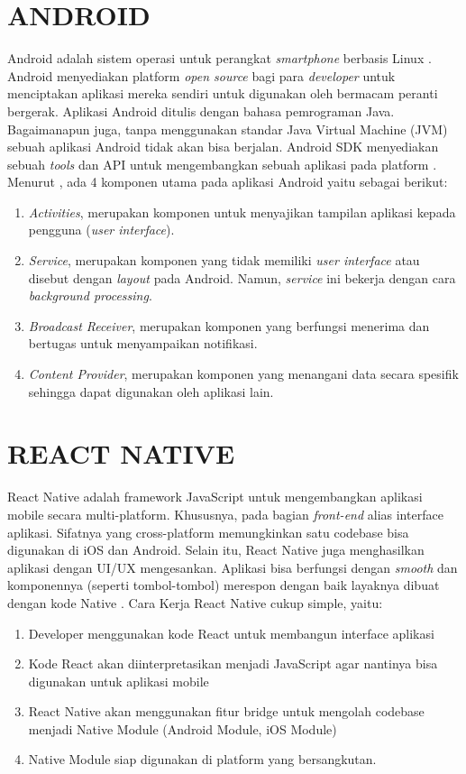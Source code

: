 \section{\uppercase{ANDROID}}
Android adalah sistem operasi untuk perangkat \textit{smartphone} berbasis Linux \citep{Safaat2011}. Android menyediakan platform \textit{open source} bagi para \textit{developer} untuk menciptakan aplikasi mereka sendiri untuk digunakan oleh bermacam peranti bergerak. Aplikasi Android ditulis dengan bahasa pemrograman Java. Bagaimanapun juga, tanpa menggunakan standar Java Virtual Machine (JVM) sebuah aplikasi Android tidak akan bisa berjalan. Android SDK menyediakan sebuah \textit{tools} dan API untuk mengembangkan sebuah aplikasi pada platform \citep{Sarkar2019}. Menurut \cite{Supardi2011}, ada 4 komponen utama pada aplikasi Android yaitu sebagai berikut:
\begin{enumerate}[1.]
	\itemsep0em
	\item \emph{Activities}, merupakan komponen untuk menyajikan tampilan aplikasi kepada pengguna (\textit{user interface}).
	\item \emph{Service}, merupakan komponen yang tidak memiliki \textit{user interface} atau disebut dengan \textit{layout} pada Android. Namun, \textit{service} ini bekerja dengan cara \textit{background processing}.
	\item \emph{Broadcast Receiver}, merupakan komponen yang berfungsi menerima dan bertugas untuk menyampaikan notifikasi.
	\item \emph{Content Provider}, merupakan komponen yang menangani data secara spesifik sehingga dapat digunakan oleh aplikasi lain.
\end{enumerate}

\section{\uppercase{REACT NATIVE}}
React Native adalah framework JavaScript untuk mengembangkan aplikasi mobile secara multi-platform. Khususnya, pada bagian \textit{front-end} alias interface aplikasi. Sifatnya yang cross-platform memungkinkan satu codebase bisa digunakan di iOS dan Android. Selain itu, React Native juga menghasilkan aplikasi dengan UI/UX mengesankan. Aplikasi bisa berfungsi dengan \textit{smooth} dan komponennya (seperti tombol-tombol) merespon dengan baik layaknya dibuat dengan kode Native \citep{Brito2018}. Cara Kerja React Native cukup simple, yaitu:
\begin{enumerate}[1.]
	\itemsep0em
	\item Developer menggunakan kode React untuk membangun interface aplikasi
	\item Kode React akan diinterpretasikan menjadi JavaScript agar nantinya bisa digunakan untuk aplikasi mobile
	\item React Native akan menggunakan fitur bridge untuk mengolah codebase menjadi Native Module (Android Module, iOS Module)
	\item Native Module siap digunakan di platform yang bersangkutan.
\end{enumerate}

